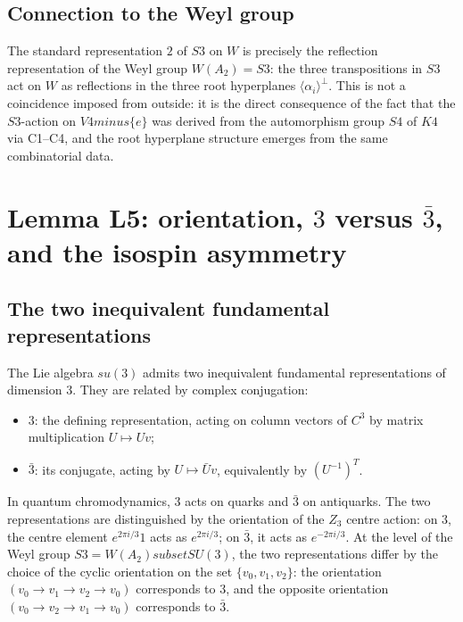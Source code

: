 \documentclass[11pt,a4paper]{article}
\def\Sfour{S4}%
\def\Vfour{V4}%
\def\Sthree{S3}%
\def\SUthree{SU(3)}%
\def\Kfour{K4}%
\def\cong{=}%
\def\setminus{ minus }%
\def\subset{ subset }%
\def\mathbb#1{#1}%
\def\mathrm#1{#1}%
\def\mathfrak#1{#1}%
\def\mathbf#1{#1}%
\theoremstyle{plain}
\theoremstyle{definition}
\theoremstyle{remark}
\newcommand{\Kfour}{K_4}
\newcommand{\Sfour}{S_4}
\newcommand{\Vfour}{V_4}
\newcommand{\Sthree}{S_3}
\newcommand{\SUthree}{\mathrm{SU}(3)}
\newcommand{\suthree}{\mathfrak{su}(3)}
\begin{document}
\subsection{Connection to the Weyl group}

The standard representation $\mathbf{2}$ of $\Sthree$ on $W$ is precisely the reflection representation of the Weyl group $W(A_2) \cong \Sthree$: the three transpositions in $\Sthree$ act on $W$ as reflections in the three root hyperplanes $\langle\alpha_i\rangle^\perp$. This is not a coincidence imposed from outside: it is the direct consequence of the fact that the $\Sthree$-action on $\Vfour\setminus\{e\}$ was derived from the automorphism group $\Sfour$ of $\Kfour$ via C1--C4, and the root hyperplane structure emerges from the same combinatorial data.

\section{Lemma L5: orientation, \texorpdfstring{$\mathbf{3}$}{3} versus \texorpdfstring{$\bar{\mathbf{3}}$}{3-bar}, and the isospin asymmetry}
\label{sec:L5}

\subsection{The two inequivalent fundamental representations}

The Lie algebra $\suthree$ admits two inequivalent fundamental representations of dimension 3. They are related by complex conjugation:
\begin{itemize}[leftmargin=2em]
\item $\mathbf{3}$: the defining representation, acting on column vectors of $\mathbb{C}^3$ by matrix multiplication $U \mapsto U\mathbf{v}$;
\item $\bar{\mathbf{3}}$: its conjugate, acting by $U \mapsto \bar{U}\mathbf{v}$, equivalently by $(U^{-1})^T$.
\end{itemize}
In quantum chromodynamics, $\mathbf{3}$ acts on quarks and $\bar{\mathbf{3}}$ on antiquarks. The two representations are distinguished by the orientation of the $\mathbb{Z}_3$ centre action: on $\mathbf{3}$, the centre element $e^{2\pi i/3}\mathbf{1}$ acts as $e^{2\pi i/3}$; on $\bar{\mathbf{3}}$, it acts as $e^{-2\pi i/3}$. At the level of the Weyl group $\Sthree \cong W(A_2) \subset \SUthree$, the two representations differ by the choice of the cyclic orientation on the set $\{v_0, v_1, v_2\}$: the orientation $(v_0 \to v_1 \to v_2 \to v_0)$ corresponds to $\mathbf{3}$, and the opposite orientation $(v_0 \to v_2 \to v_1 \to v_0)$ corresponds to $\bar{\mathbf{3}}$.
\end{document}
